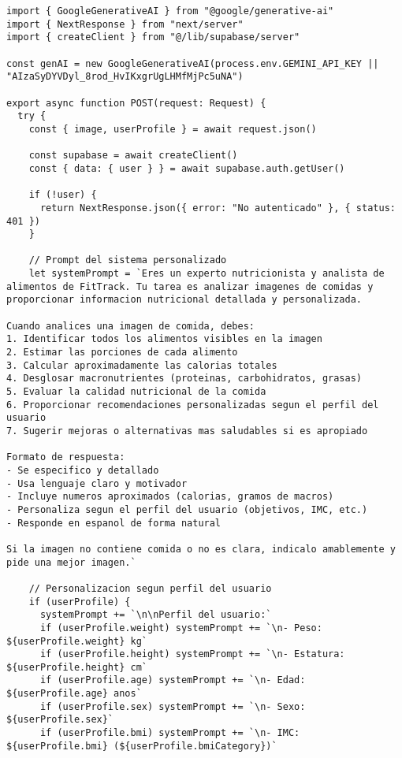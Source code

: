 \documentclass[12pt,a4paper]{article}
\begin{document}
\begin{lstlisting}[caption=API de analisis de imagenes especializada]
import { GoogleGenerativeAI } from "@google/generative-ai"
import { NextResponse } from "next/server"
import { createClient } from "@/lib/supabase/server"

const genAI = new GoogleGenerativeAI(process.env.GEMINI_API_KEY || "AIzaSyDYVDyl_8rod_HvIKxgrUgLHMfMjPc5uNA")

export async function POST(request: Request) {
  try {
    const { image, userProfile } = await request.json()

    const supabase = await createClient()
    const { data: { user } } = await supabase.auth.getUser()

    if (!user) {
      return NextResponse.json({ error: "No autenticado" }, { status: 401 })
    }

    // Prompt del sistema personalizado
    let systemPrompt = `Eres un experto nutricionista y analista de alimentos de FitTrack. Tu tarea es analizar imagenes de comidas y proporcionar informacion nutricional detallada y personalizada.

Cuando analices una imagen de comida, debes:
1. Identificar todos los alimentos visibles en la imagen
2. Estimar las porciones de cada alimento
3. Calcular aproximadamente las calorias totales
4. Desglosar macronutrientes (proteinas, carbohidratos, grasas)
5. Evaluar la calidad nutricional de la comida
6. Proporcionar recomendaciones personalizadas segun el perfil del usuario
7. Sugerir mejoras o alternativas mas saludables si es apropiado

Formato de respuesta:
- Se especifico y detallado
- Usa lenguaje claro y motivador
- Incluye numeros aproximados (calorias, gramos de macros)
- Personaliza segun el perfil del usuario (objetivos, IMC, etc.)
- Responde en espanol de forma natural

Si la imagen no contiene comida o no es clara, indicalo amablemente y pide una mejor imagen.`

    // Personalizacion segun perfil del usuario
    if (userProfile) {
      systemPrompt += `\n\nPerfil del usuario:`
      if (userProfile.weight) systemPrompt += `\n- Peso: ${userProfile.weight} kg`
      if (userProfile.height) systemPrompt += `\n- Estatura: ${userProfile.height} cm`
      if (userProfile.age) systemPrompt += `\n- Edad: ${userProfile.age} anos`
      if (userProfile.sex) systemPrompt += `\n- Sexo: ${userProfile.sex}`
      if (userProfile.bmi) systemPrompt += `\n- IMC: ${userProfile.bmi} (${userProfile.bmiCategory})`


\end{lstlisting}
\end{document}
